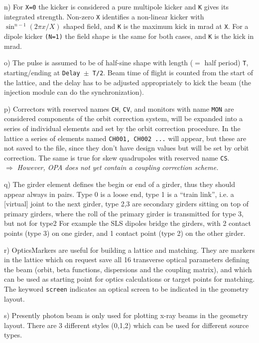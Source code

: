 \documentclass[12pt]{article}
\newcommand\todo[1]{$\Longrightarrow$ {\em #1} }
\begin{document}
n) For {\tt X=0} the kicker is considered a pure multipole kicker and {\tt K} gives its integrated strength. Non-zero {\tt X} identifies a non-linear kicker with $\sin^{n-1}(2\pi x/X)$ shaped field, and {\tt K} is the maximum kick in mrad at {\tt X}. For a dipole kicker {\tt (N=1)} the field shape is the same for both cases, and {\tt K} is the kick in mrad.

o) The pulse is assumed to be of half-sine shape with length ($=$ half period) {\tt T}, starting/ending at {\tt Delay $\pm$ T/2}. Beam time of flight is counted from the start of the lattice, and the delay has to be adjusted appropriately to kick the beam (the injection module can do the synchronization).

p) Correctors with reserved names {\tt CH}, {\tt CV}, and monitors with name {\tt MON} are considered components of the orbit correction system, will be expanded into a series of individual elements and set by the orbit correction procedure. In the lattice a series of elements named {\tt CH001, CH002 ...} will appear, but these are not saved to the file, since they don't have design values but will be set by orbit correction. The same is true for skew quadrupoles with reserved name {\tt CS}. \\
\todo{However, OPA does not yet contain a coupling correction scheme.}

q) The girder element defines the begin or end of a girder, thus they should appear always in pairs. Type 0 is a loose end, type 1 is a ``train link'', i.e. a [virtual] joint to the next girder, type 2,3 are secondary girders sitting on top of primary girders, where the roll of the primary girder is transmitted for type 3, but not for type2 For example the SLS dipoles bridge the girders, with 2 contact points (type 3) on one girder, and 1 contact point (type 2) on the other girder.

r) OpticsMarkers are useful for building a lattice and matching. They are markers in the lattice which on request save all 16 transverse optical parameters defining the beam (orbit, beta functions, dispersions and the coupling matrix), and which can be used as starting point for optics calculations or target points for matching. The keyword {\tt screen} indicates an optical screen to be indicated in the geometry layout.

s) Presently photon beam is only used for plotting x-ray beams in the geometry layout. There are 3 different styles (0,1,2) which can be used for different source types.
\end{document}

